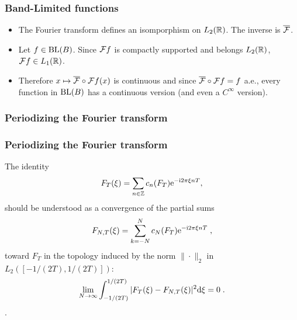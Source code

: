 \begin{frame}
\frametitle{Band-Limited functions}
\begin{itemize}
\item The Fourier transform defines an isomporphism on $L_2(\mathbb{R})$. The inverse is $\overline{\mathcal{F}}$.
\item Let  $f \in \mathrm{BL}(B)$. Since $\mathcal{F} f$ is compactly supported and belongs $L_2(\mathbb{R})$, $\mathcal{F} f  \in L_1(\mathbb{R})$.
\item Therefore $x \mapsto \overline{\mathcal{F}} \circ \mathcal{F} f(x)$ is continuous and since $\overline{\mathcal{F}} \circ \mathcal{F} f= f$ a.e., every function in $\mathrm{BL}(B)$ has a continuous version (and even a $C^\infty$ version).
\end{itemize}
\end{frame}

\begin{frame}
\frametitle{Periodizing the Fourier transform}
\end{frame}

\begin{frame}
\frametitle{Periodizing the Fourier transform}
The identity
\begin{equation*}
F_T (\xi) = \sum_{n \in \mathbb{Z}} c_n(F_T) \mathrm{e}^{- \mathrm{i} 2 \pi \xi n T},
\end{equation*}
should be understood as a convergence of the partial sums
\begin{equation*}
F_{N,T}(\xi)= \sum_{k=-N}^N c_N(F_T) \mathrm{e}^{- \mathrm{i} 2 \pi \xi n T} \;,
\end{equation*}
toward $F_T$ in the topology induced by the norm $\|\cdot\|_2$  in $L_2([-1/(2T),1/(2T)])$:
$$
\lim_{N \to \infty} \int_{-1/(2T)}^{1/(2T)} |F_T(\xi) - F_{N,T}(\xi)|^2 \mathrm{d} \xi =0 \;.
$$
.
\end{frame}

